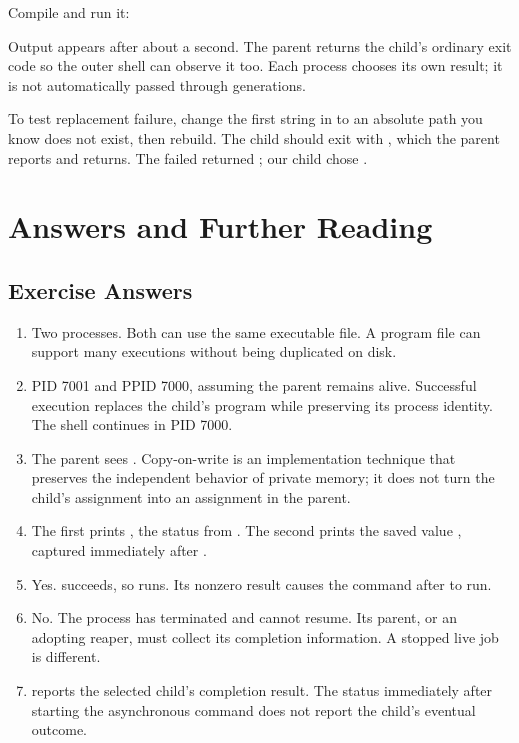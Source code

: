 \documentclass[11pt]{article}
\begin{document}
Compile and run it:


Output appears after about a second.
The parent returns the child's ordinary exit code so the outer shell can observe it too.
Each process chooses its own result; it is not automatically passed through generations.

To test replacement failure, change the first string in  to an absolute path you know does not exist, then rebuild.
The child should exit with , which the parent reports and returns.
The failed  returned ; our child chose .

\clearpage
\section{Answers and Further Reading}

\subsection*{Exercise Answers}

\begin{enumerate}
\item Two processes.
Both can use the same executable file.
A program file can support many executions without being duplicated on disk.
\item PID 7001 and PPID 7000, assuming the parent remains alive.
Successful execution replaces the child's program while preserving its process identity.
The shell continues in PID 7000.
\item The parent sees .
Copy-on-write is an implementation technique that preserves the independent behavior of private memory; it does not turn the child's assignment into an assignment in the parent.
\item The first  prints , the status from .
The second prints the saved value , captured immediately after .
\item Yes.
 succeeds, so  runs.
Its nonzero result causes the command after \inlinesh{||} to run.
\item No.
The process has terminated and cannot resume.
Its parent, or an adopting reaper, must collect its completion information.
A stopped live job is different.
\item {} reports the selected child's completion result.
The status immediately after starting the asynchronous command does not report the child's eventual outcome.
\end{enumerate}
\end{document}
